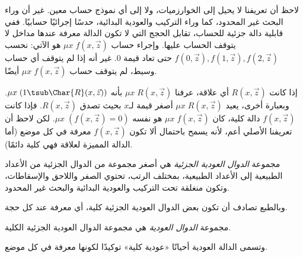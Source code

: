 \documentclass[../../../include/open-logic-section]{subfiles}
\begin{document}
\begin{explain}
لاحظ أن تعريفنا لا يحيل إلى
الخوارزميات، ولا إلى أي نموذج حساب معين. غير أن وراء البحث غير المحدود،
كما وراء التركيب والعودية البدائية، حدسًا إجرائيًا حسابيًا. ففي قابلية
دالة جزئية للحساب، تقابل الحجج التي لا تكون الدالة معرفة عندها مداخل
لا يتوقف الحساب عليها. وإجراء حساب $\mu x\;f(x,\vec z)$ هو الآتي:
نحسب $f(0,\vec z), f(1,\vec z), f(2,\vec z)$ حتى تعاد قيمة
0. غير أنه إذا لم يتوقف أي حساب وسيط، لم يتوقف حساب
$\mu x\;f(x,\vec z)$ أيضًا.
\end{explain}

إذا كانت $R(x,\vec z)$ أي علاقة، عرفنا $\mu x\;R(x,\vec z)$ بأنه
$\mu x\;(1\tsub\Char{R}(x,\vec z))$. وبعبارة أخرى، يعيد
$\mu x\;R(x,\vec z)$ أصغر قيمة لـ$x$ بحيث تصدق $R(x,\vec z)$.
فإذا كانت $f(x,\vec z)$ دالة كلية، كان $\mu x\;f(x,\vec z)$ هو نفسه
$\mu x\;(f(x,\vec z)=0)$. لكن لاحظ أن تعريفنا الأصلي أعم، لأنه يسمح
باحتمال ألا تكون $f(x,\vec z)$ معرفة في كل موضع (أما الدالة المميزة
لعلاقة فهي كلية دائمًا).

\begin{defn}
مجموعة \emph{الدوال العودية الجزئية} هي أصغر مجموعة من الدوال الجزئية
من الأعداد الطبيعية إلى الأعداد الطبيعية، بمختلف الرتب، تحتوي الصفر
واللاحق والإسقاطات، وتكون منغلقة تحت التركيب والعودية البدائية والبحث
غير المحدود.
\end{defn}

وبالطبع تصادف أن تكون بعض الدوال العودية الجزئية كلية، أي معرفة عند كل
حجة.

\begin{defn}
مجموعة \emph{الدوال العودية} هي مجموعة الدوال العودية الجزئية الكلية.
\end{defn}

وتسمى الدالة العودية أحيانًا «عودية كلية» توكيدًا لكونها معرفة في كل
موضع.
\end{document}
